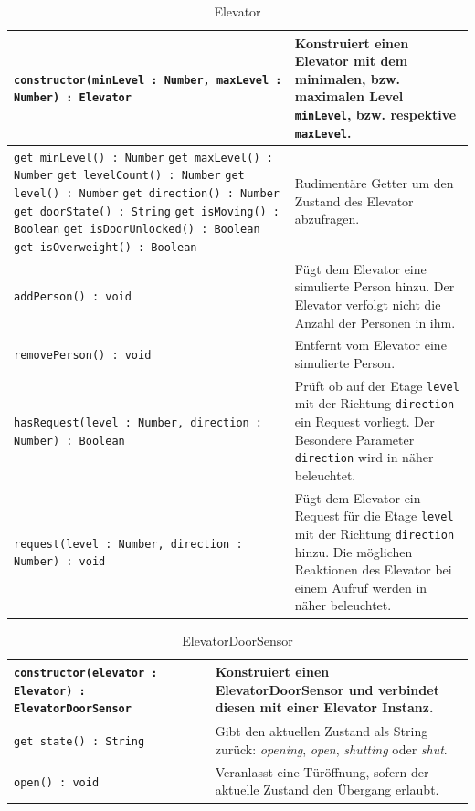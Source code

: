 \begin{table}[htb]
	\begin{tabularx}{0.92\textwidth}{lX}
		\texttt{constructor(minLevel : Number, maxLevel : Number) : Elevator} & Konstruiert einen Elevator mit dem minimalen, bzw. maximalen Level \texttt{minLevel}, bzw. respektive \texttt{maxLevel}. \\ \hline
		\texttt{get minLevel() : Number}
		\texttt{get maxLevel() : Number}
		\texttt{get levelCount() : Number}
		\texttt{get level() : Number}
		\texttt{get direction() : Number}
		\texttt{get doorState() : String}
		\texttt{get isMoving() : Boolean}
		\texttt{get isDoorUnlocked() : Boolean}
		\texttt{get isOverweight() : Boolean}                             & Rudimentäre Getter um den Zustand des Elevator abzufragen. \\ \hline
		\texttt{addPerson() : void}                                       & Fügt dem Elevator eine simulierte Person hinzu. Der Elevator verfolgt nicht die Anzahl der Personen in ihm. \\ \hline
		\texttt{removePerson() : void}                                    & Entfernt vom Elevator eine simulierte Person. \\ \hline
		\texttt{hasRequest(level : Number, direction : Number) : Boolean} & Prüft ob auf der Etage \texttt{level} mit der Richtung \texttt{direction} ein Request vorliegt. Der Besondere Parameter \texttt{direction} wird in \textit{\nameref{imp_model}} näher beleuchtet. \\ \hline
		\texttt{request(level : Number, direction : Number) : void}       & Fügt dem Elevator ein Request für die Etage \texttt{level} mit der Richtung \texttt{direction} hinzu. Die möglichen Reaktionen des Elevator bei einem Aufruf werden in \textit{\nameref{imp_model}} näher beleuchtet. \\ \hline
	\end{tabularx}
\caption{Elevator}
\end{table}

\begin{table}[htb]
	\begin{tabularx}{0.92\textwidth}{lX}
		\texttt{constructor(elevator : Elevator) : ElevatorDoorSensor} & Konstruiert einen ElevatorDoorSensor und verbindet diesen mit einer Elevator Instanz. \\ \hline
		\texttt{get state() : String} & Gibt den aktuellen Zustand als String zurück: \textit{opening}, \textit{open}, \textit{shutting} oder \textit{shut}. \\ \hline
		\texttt{open() : void}        & Veranlasst eine Türöffnung, sofern der aktuelle Zustand den Übergang erlaubt. \\ \hline
	\end{tabularx}
\caption{ElevatorDoorSensor}
\end{table}

